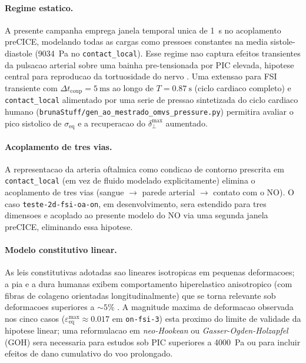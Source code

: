 \paragraph{Regime estatico.} A presente campanha emprega janela temporal unica de \SI{1}{\second} no acoplamento preCICE, modelando todas as cargas como pressoes constantes na media sistole-diastole (\SI{9034}{\pascal} no \texttt{contact\_local}). Esse regime nao captura efeitos transientes da pulsacao arterial sobre uma bainha pre-tensionada por PIC elevada, hipotese central para reproducao da tortuosidade do nervo \citep{Chiang2025ONT}. Uma extensao para FSI transiente com $\Delta t_{\mathrm{coup}} = \SI{5}{\milli\second}$ ao longo de $T = \SI{0.87}{\second}$ (ciclo cardiaco completo) e \texttt{contact\_local} alimentado por uma serie de pressao sintetizada do ciclo cardiaco humano (\texttt{brunaStuff/gen\_ao\_mestrado\_omvs\_pressure.py}) permitira avaliar o pico sistolico de $\sigma_{\mathrm{eq}}$ e a recuperacao do $\delta_{\perp}^{\max}$ aumentado.

\paragraph{Acoplamento de tres vias.} A representacao da arteria oftalmica como condicao de contorno prescrita em \texttt{contact\_local} (em vez de fluido modelado explicitamente) elimina o acoplamento de tres vias (sangue $\rightarrow$ parede arterial $\rightarrow$ contato com o NO). O caso \texttt{teste-2d-fsi-oa-on}, em desenvolvimento, sera estendido para tres dimensoes e acoplado ao presente modelo do NO via uma segunda janela preCICE, eliminando essa hipotese.

\paragraph{Modelo constitutivo linear.} As leis constitutivas adotadas sao lineares isotropicas em pequenas deformacoes; a pia e a dura humanas exibem comportamento hiperelastico anisotropico (com fibras de colageno orientadas longitudinalmente) que se torna relevante sob deformacoes superiores a $\sim 5\%$ \citep{Holzapfel2000}. A magnitude maxima de deformacao observada nos cinco casos ($\varepsilon_{\mathrm{eq}}^{\max} \approx 0.017$ em \texttt{on-fsi-3}) esta proximo do limite de validade da hipotese linear; uma reformulacao em \emph{neo-Hookean} ou \emph{Gasser-Ogden-Holzapfel} (GOH) sera necessaria para estudos sob PIC superiores a \SI{4000}{\pascal} ou para incluir efeitos de dano cumulativo do voo prolongado.

